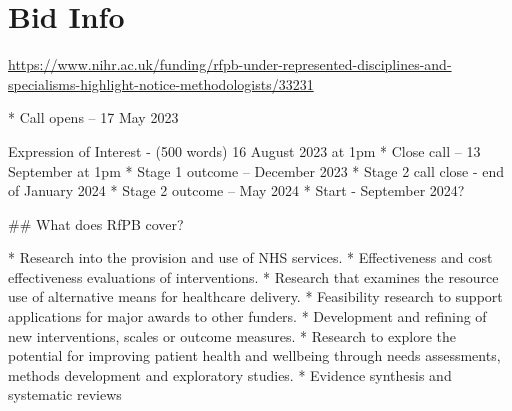 \section{Bid Info}

\url{https://www.nihr.ac.uk/funding/rfpb-under-represented-disciplines-and-specialisms-highlight-notice-methodologists/33231}

\begin{markdown}

* Call opens – 17 May 2023    \item Expression of Interest - (500 words) 16 August 2023 at 1pm
* Close call – 13 September at 1pm
* Stage 1 outcome – December 2023
* Stage 2 call close - end of January 2024
* Stage 2 outcome – May 2024
* Start - September 2024?

## What does RfPB cover?

* Research into the provision and use of NHS services.
* Effectiveness and cost effectiveness evaluations of interventions.
* Research that examines the resource use of alternative means for healthcare delivery.
* Feasibility research to support applications for major awards to other funders.
* Development and refining of new interventions, scales or outcome measures.
*  Research to explore the potential for improving patient health and wellbeing through needs assessments, methods development and exploratory studies.
* Evidence synthesis and systematic reviews
\end{markdown}
